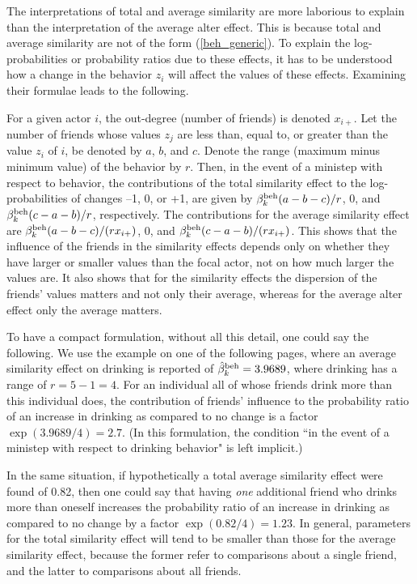 \documentclass[a4paper,fleqn,11pt]{article}
\newcommand{\+}{\, + \,}
\begin{document}
The interpretations of total and average similarity are more laborious
to explain than the interpretation of the average alter effect.
This is because total and average similarity are not of the form
(\ref{beh_generic}). To explain the log-probabilities or probability ratios due to these
effects, it has to be understood how a change in the behavior $z_i$
will affect the values of these effects.
Examining their formulae leads to the following.

For a given actor $i$, the out-degree (number of friends) is denoted $x_{i+}$.
Let the number of friends whose values $z_j$ are less than, equal to,
or greater than the value $z_i $ of $i$, be denoted by $a$, $b$, and $c$.
Denote the range (maximum minus minimum value) of the behavior by $r$.
Then, in the event of a ministep with respect to behavior,
the contributions of the total similarity effect to the log-probabilities
of changes --1, 0, or +1, are given by $\beta^{\rm beh}_k(a-b-c)/r$,
0, and $\beta^{\rm beh}_k(c-a-b)/r$, respectively.
The contributions for the average similarity effect are
$\beta^{\rm beh}_k(a-b-c)/(rx_{i+})$,
0, and $\beta^{\rm beh}_k(c-a-b)/(rx_{i+})$.
This shows that the influence of the friends in the similarity effects
depends only on whether they have larger or smaller values than the focal actor,
not on how much larger the values are.
It also shows that for the similarity effects the dispersion of the
friends' values matters and not only their average,
whereas for the average alter effect only the average matters.

To have a compact formulation, without all this detail, one could
say the following. We use the example on one of the following
pages, where an average similarity effect on drinking is reported of
$\hat\beta^{\rm beh}_k = 3.9689$, where drinking has a range of $r = 5-1 = 4$.
For an individual all of whose friends drink more than this individual does,
the contribution of friends' influence to the probability ratio of an increase in drinking
as compared to no change is a factor $\exp(3.9689/4) = 2.7$.
(In this formulation, the condition ``in the event of a ministep
with respect to drinking behavior" is left implicit.)

In the same situation, if hypothetically a total average similarity
effect were found of 0.82, then one could say that having \emph{one} additional
friend who drinks more than oneself increases the probability ratio of an increase in drinking
as compared to no change by a factor $\exp(0.82/4) = 1.23$.
In general, parameters for the total similarity effect will tend to be
smaller than those for the average similarity effect, because the former
refer to comparisons about a single friend, and the latter to comparisons
about all friends.
\end{document}
